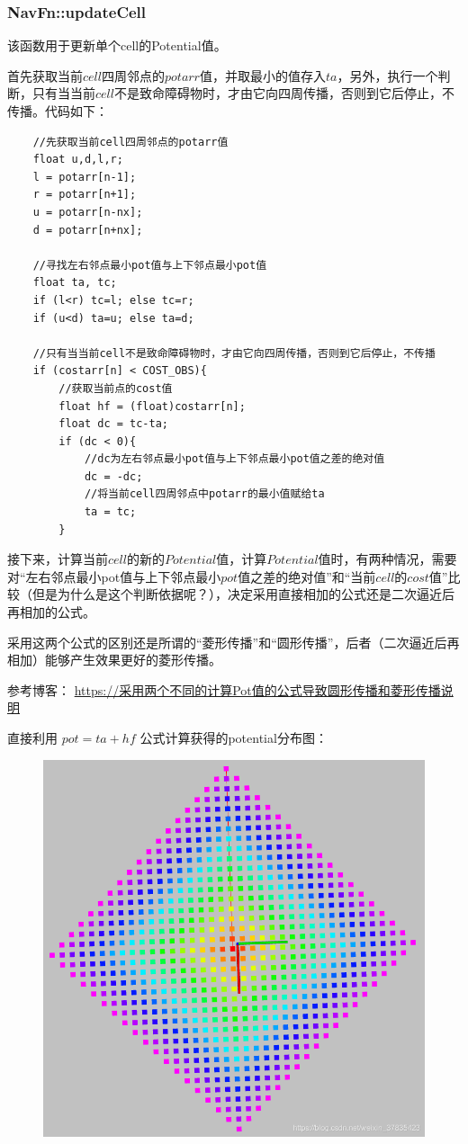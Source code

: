 \documentclass[9pt, oneside]{book}
\begin{document}
\subsubsection{NavFn::updateCell}

该函数用于更新单个cell的Potential值。

首先获取当前$cell$四周邻点的$potarr$值，并取最小的值存入$ta$，另外，执行一个判断，只有当当前$cell$不是致命障碍物时，才由它向四周传播，否则到它后停止，不传播。代码如下：

\begin{verbatim}
    //先获取当前cell四周邻点的potarr值
    float u,d,l,r;
    l = potarr[n-1];
    r = potarr[n+1];		
    u = potarr[n-nx];
    d = potarr[n+nx];

    //寻找左右邻点最小pot值与上下邻点最小pot值
    float ta, tc;
    if (l<r) tc=l; else tc=r;
    if (u<d) ta=u; else ta=d;

    //只有当当前cell不是致命障碍物时，才由它向四周传播，否则到它后停止，不传播
    if (costarr[n] < COST_OBS){
        //获取当前点的cost值
        float hf = (float)costarr[n];
        float dc = tc-ta;
        if (dc < 0){
            //dc为左右邻点最小pot值与上下邻点最小pot值之差的绝对值
            dc = -dc;
            //将当前cell四周邻点中potarr的最小值赋给ta
            ta = tc;
        }
\end{verbatim}

接下来，计算当前$cell$的新的$Potential$值，计算$Potential$值时，有两种情况，需要对“左右邻点最小pot值与上下邻点最小$pot$值之差的绝对值”和“当前$cell$的$cost$值”比较（但是为什么是这个判断依据呢？），决定采用直接相加的公式还是二次逼近后再相加的公式。

采用这两个公式的区别还是所谓的“菱形传播”和“圆形传播”，后者（二次逼近后再相加）能够产生效果更好的菱形传播。

参考博客：
\href{https://blog.csdn.net/weixin_37835423/article/details/102996256?spm=1001.2101.3001.6650.5&utm_medium=distribute.pc_relevant.none-task-blog-2%7Edefault%7EBlogCommendFromBaidu%7Edefault-5.no_search_link&depth_1-utm_source=distribute.pc_relevant.none-task-blog-2%7Edefault%7EBlogCommendFromBaidu%7Edefault-5.no_search_link}{https://采用两个不同的计算Pot值的公式导致圆形传播和菱形传播说明}

直接利用 $pot = ta+hf$ 公式计算获得的potential分布图：

\begin{figure}[H]
    \centering
    \includegraphics[width=0.5\linewidth]{image/pot_simple_equation.png}
\end{figure}
\end{document}
